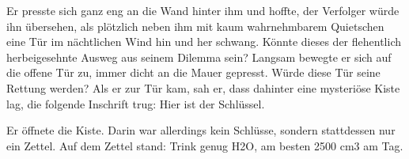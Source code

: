 \documentclass[a4paper]{article}
\begin{document}

Er presste sich ganz eng an die Wand hinter ihm und hoffte, der Verfolger würde ihn übersehen, als plötzlich neben ihm mit kaum wahrnehmbarem Quietschen eine Tür im nächtlichen Wind hin und her schwang. Könnte dieses der flehentlich herbeigesehnte Ausweg aus seinem Dilemma sein? Langsam bewegte er sich auf die offene Tür zu, immer dicht an die Mauer gepresst. Würde diese Tür seine Rettung werden? Als er zur Tür kam, sah er, dass dahinter eine mysteriöse Kiste lag, die folgende Inschrift trug: Hier ist der Schlüssel. 



Er öffnete die Kiste. Darin war allerdings kein Schlüsse, sondern stattdessen nur ein Zettel. Auf dem Zettel stand: Trink genug H2O, am besten 2500 cm3 am Tag. 

\end{document}
